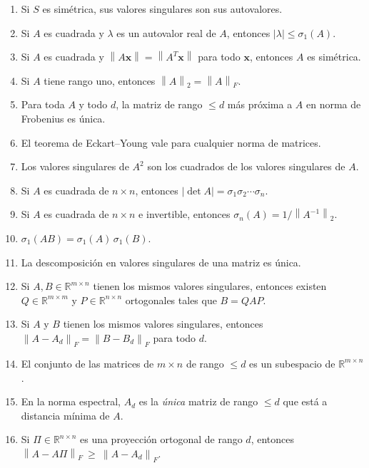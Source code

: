 \documentclass[11pt,a4paper]{article}
\newcommand{\R}{\mathbb{R}}
\newcommand{\bi}[1]{\boldsymbol{#1}}
\newcommand{\norm}[1]{\left\|#1\right\|}
\newcommand{\normF}[1]{\left\|#1\right\|_{F}}
\newcommand{\normdos}[1]{\left\|#1\right\|_{2}}
\begin{document}
\begin{enumerate}[label=\textbf{\arabic*.},itemsep=3pt,topsep=4pt,leftmargin=*]
\item Si $S$ es simétrica, sus valores singulares son sus autovalores.

\item Si $A$ es cuadrada y $\lambda$ es un autovalor real de $A$, entonces
$|\lambda|\le\sigma_1(A)$.

\item Si $A$ es cuadrada y $\norm{A\bi x}=\norm{A^T\bi x}$ para todo $\bi x$,
entonces $A$ es simétrica.

\item Si $A$ tiene rango uno, entonces $\normdos{A}=\normF{A}$.

\item Para toda $A$ y todo $d$, la matriz de rango $\le d$ más próxima a $A$
en norma de Frobenius es única.

\item El teorema de Eckart--Young vale para cualquier norma de matrices.

\item Los valores singulares de $A^2$ son los cuadrados de los valores
singulares de $A$.

\item Si $A$ es cuadrada de $n\times n$, entonces
$|\det A|=\sigma_1\sigma_2\cdots\sigma_n$.

\item Si $A$ es cuadrada de $n\times n$ e invertible, entonces
$\sigma_n(A)=1/\normdos{A^{-1}}$.

\item $\sigma_1(AB)=\sigma_1(A)\,\sigma_1(B)$.

\item La descomposición en valores singulares de una matriz es única.

\item Si $A,B\in\R^{m\times n}$ tienen los mismos valores singulares, entonces
existen $Q\in\R^{m\times m}$ y $P\in\R^{n\times n}$ ortogonales tales que
$B=QAP$.

\item Si $A$ y $B$ tienen los mismos valores singulares, entonces
$\normF{A-A_d}=\normF{B-B_d}$ para todo $d$.

\item El conjunto de las matrices de $m\times n$ de rango $\le d$ es un
subespacio de $\R^{m\times n}$.

\item En la norma espectral, $A_d$ es la \emph{única} matriz de rango $\le d$
que está a distancia mínima de $A$.

\item Si $\Pi\in\R^{n\times n}$ es una proyección ortogonal de rango $d$,
entonces $\normF{A-A\Pi}\ \ge\ \normF{A-A_d}$.
\end{enumerate}
\end{document}
